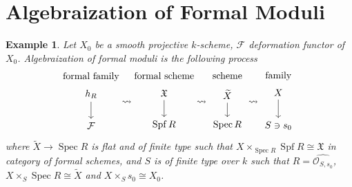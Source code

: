 \documentclass{ctexart}
\newtheorem{example}{Example}[section]
\newcommand{\spec}{\operatorname{Spec}}
\newcommand{\spf}{\operatorname{Spf}}
\begin{document}
\section{Algebraization of Formal Moduli}
\label{section:Algebraization_of_Formal_Moduli}

\begin{example}
    Let $X_{0}$ be a smooth projective $k$-scheme, $\mathcal{F}$ deformation functor of $X_{0}$.
    Algebraization of formal moduli is the following process
    \begin{equation*}
        \begin{gathered}
            \text{formal family} \\
            \begin{tikzcd}
                h_{R} \arrow[d] \\
                \mathcal{F}
            \end{tikzcd}
        \end{gathered}
        \rightsquigarrow
        \begin{gathered}
            \text{formal scheme} \\
            \begin{tikzcd}
                \mathfrak{X} \arrow[d] \\
                \spf R
            \end{tikzcd}
        \end{gathered}
        \rightsquigarrow
        \begin{gathered}
            \text{scheme} \\
            \begin{tikzcd}[row sep = 1.53 em]
                \widetilde{X} \arrow[d] \\
                \spec R
            \end{tikzcd}
        \end{gathered}
        \rightsquigarrow
        \begin{gathered}
            \text{family} \\
            \begin{tikzcd}[row sep = 1.95 em]
                X \arrow[d] \\
                S\ni s_{0}
            \end{tikzcd}
        \end{gathered}
    \end{equation*}
    where $\widetilde{X} \rightarrow \spec R$ is flat and of finite type such that $X \times_{\spec R} \spf R \cong \mathfrak{X}$ in category of formal schemes,
    and $S$ is of finite type over $k$ such that $R = \widehat{\mathcal{O}_{S, s_{0}}}$, $X \times_{S} \spec R \cong \widetilde{X}$ and $X \times_{S} s_{0} \cong X_{0}$.
\end{example}
\end{document}
